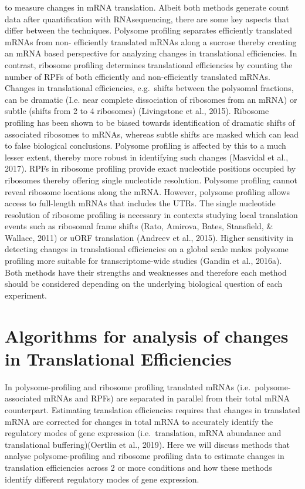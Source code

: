 \documentclass[12pt,openany]{book}
\begin{document}
to measure changes in mRNA translation. Albeit both methods generate
count data after quantification with RNAsequencing, there are some key
aspects that differ between the techniques. Polysome profiling separates
efficiently translated mRNAs from non- efficiently translated mRNAs
along a sucrose thereby creating an mRNA based perspective for analyzing
changes in translational efficiencies. In contrast, ribosome profiling
determines translational efficiencies by counting the number of RPFs of
both efficiently and non-efficiently translated mRNAs. Changes in
translational efficiencies, e.g.~shifts between the polysomal fractions,
can be dramatic (I.e. near complete dissociation of ribosomes from an
mRNA) or subtle (shifts from 2 to 4 ribosomes) (Livingstone et al.,
2015). Ribosome profiling has been shown to be biased towards
identification of dramatic shifts of associated ribosomes to mRNAs,
whereas subtle shifts are masked which can lead to false biological
conclusions. Polysome profiling is affected by this to a much lesser
extent, thereby more robust in identifying such changes (Masvidal et
al., 2017). RPFs in ribosome profiling provide exact nucleotide
positions occupied by ribosomes thereby offering single nucleotide
resolution. Polysome profiling cannot reveal ribosome locations along
the mRNA. However, polysome profiling allows access to full-length mRNAs
that includes the UTRs. The single nucleotide resolution of ribosome
profiling is necessary in contexts studying local translation events
such as ribosomal frame shifts (Rato, Amirova, Bates, Stansfield, \&
Wallace, 2011) or uORF translation (Andreev et al., 2015). Higher
sensitivity in detecting changes in translational efficiencies on a
global scale makes polysome profiling more suitable for
transcriptome-wide studies (Gandin et al., 2016a). Both methods have
their strengths and weaknesses and therefore each method should be
considered depending on the underlying biological question of each
experiment.

\section{Algorithms for analysis of changes in Translational Efficiencies}

In polysome-profiling and ribosome profiling translated mRNAs
(i.e.~polysome-associated mRNAs and RPFs) are separated in parallel from
their total mRNA counterpart. Estimating translation efficiencies
requires that changes in translated mRNA are corrected for changes in
total mRNA to accurately identify the regulatory modes of gene
expression (i.e.~translation, mRNA abundance and translational
buffering)(Oertlin et al., 2019). Here we will discuss methods that
analyse polysome-profiling and ribosome profiling data to estimate
changes in translation efficiencies across 2 or more conditions and how
these methods identify different regulatory modes of gene expression.
\end{document}
